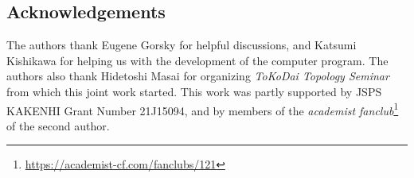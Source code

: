 \subsection*{Acknowledgements} The authors thank Eugene Gorsky for helpful discussions, and Katsumi Kishikawa for helping us with the development of the computer program. The authors also thank Hidetoshi Masai for organizing \textit{ToKoDai Topology Seminar} from which this joint work started. This work was partly supported by JSPS KAKENHI Grant Number 21J15094, and by members of the \textit{academist fanclub}\footnote{\url{https://academist-cf.com/fanclubs/121}} of the second author.
